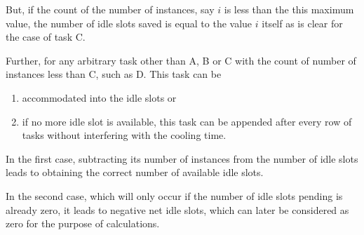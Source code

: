 \begin{itemize}
\begin{figure}[H]
\end{figure}

But, if the count of the number of instances, say $i$ is less than the this maximum value, the number of idle slots saved is equal to the value $i$ itself as is clear for the case of task C. 

Further, for any arbitrary task other than A, B or C with the count of number of instances less than C, such as D. This task can be 
\begin{enumerate}
\item accommodated into the idle slots or 
\item if no more idle slot is available, this task can be appended after every row of tasks without interfering with the cooling time.
\end{enumerate}

In the first case, subtracting its number of instances from the number of idle slots leads to obtaining the correct number of available idle slots. 

In the second case, which will only occur if the number of idle slots pending is already zero, it leads to negative net idle slots, which can later be considered as zero for the purpose of calculations.
\end{itemize}

